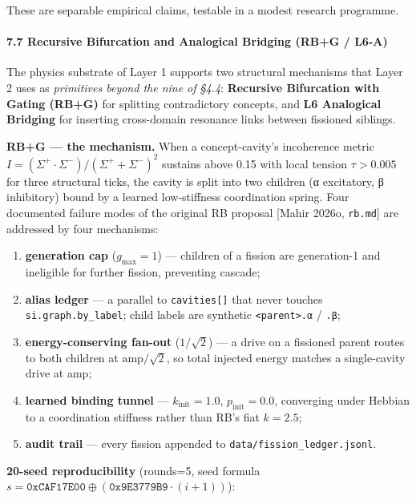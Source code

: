 \documentclass[
  11pt,
  a4paper,
]{article}
\providecommand{\tightlist}{%
  \setlength{\itemsep}{0pt}\setlength{\parskip}{0pt}}
\begin{document}
These are separable empirical claims, testable in a modest research
programme.

\paragraph{7.7 Recursive Bifurcation and Analogical Bridging (RB+G /
L6-A)}\label{recursive-bifurcation-and-analogical-bridging-rbg-l6-a}

The physics substrate of Layer 1 supports two structural mechanisms that
Layer 2 uses as \emph{primitives beyond the nine of §4.4}:
\textbf{Recursive Bifurcation with Gating (RB+G)} for splitting
contradictory concepts, and \textbf{L6 Analogical Bridging} for
inserting cross-domain resonance links between fissioned siblings.

\textbf{RB+G --- the mechanism.} When a concept-cavity's incoherence
metric \(I = (\Sigma^+ \cdot \Sigma^-) / (\Sigma^+ + \Sigma^-)^2\)
sustains above 0.15 with local tension \(\tau > 0.005\) for three
structural ticks, the cavity is split into two children (α excitatory, β
inhibitory) bound by a learned low-stiffness coordination spring. Four
documented failure modes of the original RB proposal {[}Mahir 2026o,
\texttt{rb.md}{]} are addressed by four mechanisms:

\begin{enumerate}
\def\labelenumi{\arabic{enumi}.}
\tightlist
\item
  \textbf{generation cap} (\(g_{\max}=1\)) --- children of a fission are
  generation-1 and ineligible for further fission, preventing cascade;
\item
  \textbf{alias ledger} --- a parallel to \texttt{cavities{[}{]}} that
  never touches \texttt{si.graph.by\_label}; child labels are synthetic
  \texttt{\textless{}parent\textgreater{}.α} / \texttt{.β};
\item
  \textbf{energy-conserving fan-out} (\(1/\sqrt{2}\)) --- a drive on a
  fissioned parent routes to both children at \(\text{amp}/\sqrt{2}\),
  so total injected energy matches a single-cavity drive at amp;
\item
  \textbf{learned binding tunnel} --- \(k_\text{init}=1.0\),
  \(p_\text{init}=0.0\), converging under Hebbian to a coordination
  stiffness rather than RB's fiat \(k=2.5\);
\item
  \textbf{audit trail} --- every fission appended to
  \texttt{data/fission\_ledger.jsonl}.
\end{enumerate}

\textbf{20-seed reproducibility} (rounds=5, seed formula
\(s = \mathtt{0xCAF17E00} \oplus (\mathtt{0x9E3779B9}\cdot(i+1))\)):
\end{document}
